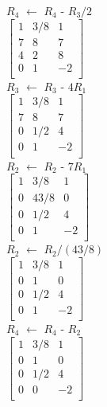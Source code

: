 \documentclass{article}
\begin{document}
  $R_4$ $\leftarrow$ $R_4$ - $R_3/2$ \\
  
  $\begin{bmatrix}
    1 & 3/8 & 1 \\
    7 & 8 & 7 \\
    4 & 2 & 8 \\
    0 & 1 & -2 \\
    \end{bmatrix}$ \\

  $R_3$ $\leftarrow$ $R_3$ - $4R_1$ \\
  
    $\begin{bmatrix}
    1 & 3/8 & 1 \\
    7 & 8 & 7 \\
    0 & 1/2 & 4 \\
    0 & 1 & -2 \\
    \end{bmatrix}$ \\
  
  $R_2$ $\leftarrow$ $R_2$ - $7R_1$ \\
  
   $\begin{bmatrix}
    1 & 3/8 & 1 \\
    0 & 43/8 & 0 \\
    0 & 1/2 & 4 \\
    0 & 1 & -2 \\
    \end{bmatrix}$ \\
    
  $R_2$ $\leftarrow$ $R_2/(43/8)$ \\
  
  $\begin{bmatrix}
    1 & 3/8 & 1 \\
    0 & 1 & 0 \\
    0 & 1/2 & 4 \\
    0 & 1 & -2 \\
    \end{bmatrix}$ \\
    
  $R_4$ $\leftarrow$ $R_4$ - $R_2$\\
  
  $\begin{bmatrix}
    1 & 3/8 & 1 \\
    0 & 1 & 0 \\
    0 & 1/2 & 4 \\
    0 & 0 & -2 \\
    \end{bmatrix}$ \\
    
\end{document}
